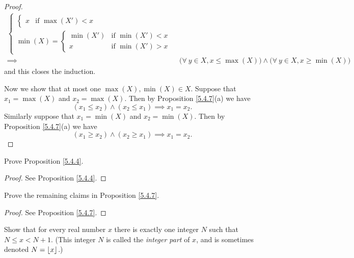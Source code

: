 \begin{proof}
\begin{align*}
\begin{cases}
\begin{cases}
                x        & \text{if } \max(X') < x
            \end{cases} \\
            \min(X) = \begin{cases}
                \min(X') & \text{if } \min(X') < x \\
                x        & \text{if } \min(X') > x
            \end{cases}
        \end{cases}                                                                                                            \\
        \implies & \big(\forall\ y \in X, x \leq \max(X)\big) \land \big(\forall\ y \in X, x \geq \min(X)\big)
    \end{align*}
    and this closes the induction.

    Now we show that at most one \(\max(X), \min(X) \in X\).
    Suppose that \(x_1 = \max(X)\) and \(x_2 = \max(X)\).
    Then by Proposition \ref{5.4.7}(a) we have
    \[
        (x_1 \leq x_2) \land (x_2 \leq x_1) \implies x_1 = x_2.
    \]
    Similarly suppose that \(x_1 = \min(X)\) and \(x_2 = \min(X)\).
    Then by Proposition \ref{5.4.7}(a) we have
    \[
        (x_1 \geq x_2) \land (x_2 \geq x_1) \implies x_1 = x_2.
    \]
\end{proof}

\exercisesection

\begin{exercise}\label{ex 5.4.1}
    Prove Proposition \ref{5.4.4}.
\end{exercise}

\begin{proof}
    See Proposition \ref{5.4.4}.
\end{proof}

\begin{exercise}\label{ex 5.4.2}
    Prove the remaining claims in Proposition \ref{5.4.7}.
\end{exercise}

\begin{proof}
    See Proposition \ref{5.4.7}.
\end{proof}

\begin{exercise}\label{ex 5.4.3}
    Show that for every real number \(x\) there is exactly one integer \(N\) such that \(N \leq x < N + 1\).
    (This integer \(N\) is called the \emph{integer part} of \(x\), and is sometimes denoted \(N = \floor*{x}\).)
\end{exercise}

